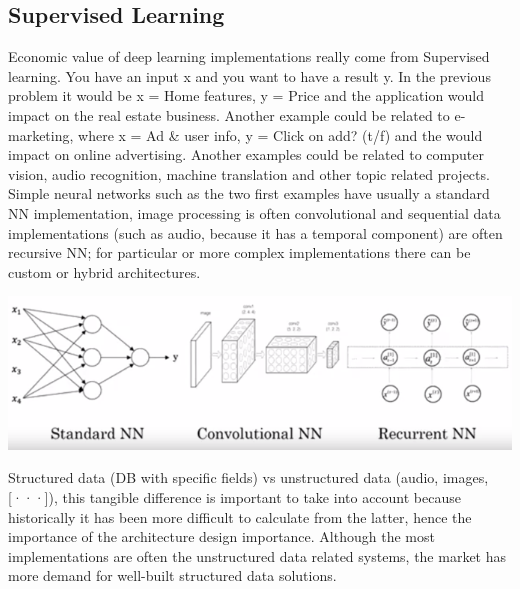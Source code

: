 \documentclass[11pt]{report}
\begin{document}
\subsection{Supervised Learning}
Economic value of deep learning implementations really come from Supervised learning.
You have an input x and you want to have a result y. In the previous problem it would be x = Home features, y = Price and the application would impact on the real estate business. Another example could be related to e-marketing, where x = Ad \& user info, y = Click on add? (t/f) and the would impact on online advertising. Another examples could be related to computer vision, audio recognition, machine translation and other topic related projects. Simple neural networks such as the two first examples have usually a standard NN implementation, image processing is often convolutional and sequential data implementations (such as audio, because it has a temporal component) are often recursive NN; for particular or more complex implementations there can be custom or hybrid architectures.
\begin{center}
	\includegraphics[width = .50\textwidth]{NNE.png}
\end{center}
Structured data (DB with specific fields) vs unstructured data (audio, images, [···]), this tangible difference is important to take into account because historically it has been more difficult to calculate from the latter, hence the importance of the architecture design importance. Although the most  implementations are often the unstructured data related systems, the market has more demand for well-built structured data solutions.
\end{document}
